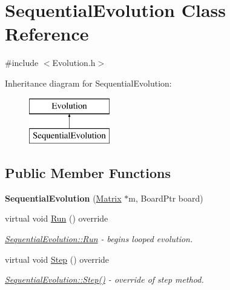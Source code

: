 \hypertarget{classSequentialEvolution}{}\section{Sequential\+Evolution Class Reference}
\label{classSequentialEvolution}


{\ttfamily \#include $<$Evolution.\+h$>$}

Inheritance diagram for Sequential\+Evolution\+:\begin{figure}[H]
\begin{center}
\leavevmode
\includegraphics[height=2.000000cm]{classSequentialEvolution}
\end{center}
\end{figure}
\subsection*{Public Member Functions}
\begin{DoxyCompactItemize}
\item 
\hypertarget{classSequentialEvolution_accfed29679c22ebffc25ffcd8736edae}{}{\bfseries Sequential\+Evolution} (\hyperlink{classMatrix}{Matrix} $\ast$m, Board\+Ptr board)\label{classSequentialEvolution_accfed29679c22ebffc25ffcd8736edae}

\item 
virtual void \hyperlink{classSequentialEvolution_aa4906c7ab5d634a8489540eea449b9ff}{Run} () override
\begin{DoxyCompactList}\small\item\em \hyperlink{classSequentialEvolution_aa4906c7ab5d634a8489540eea449b9ff}{Sequential\+Evolution\+::\+Run} -\/ begins looped evolution. \end{DoxyCompactList}\item 
\hypertarget{classSequentialEvolution_ac44e0ac2593d5aeb40fac42b36dc032d}{}virtual void \hyperlink{classSequentialEvolution_ac44e0ac2593d5aeb40fac42b36dc032d}{Step} () override\label{classSequentialEvolution_ac44e0ac2593d5aeb40fac42b36dc032d}

\begin{DoxyCompactList}\small\item\em \hyperlink{classSequentialEvolution_ac44e0ac2593d5aeb40fac42b36dc032d}{Sequential\+Evolution\+::\+Step()} -\/ override of step method. \end{DoxyCompactList}\end{DoxyCompactItemize}



